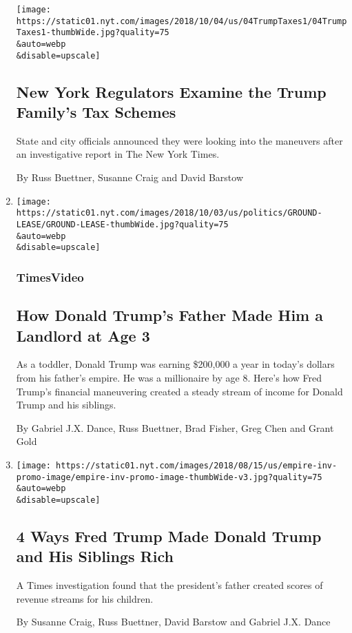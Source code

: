\begin{enumerate}
  \texttt{[image: https://static01.nyt.com/images/2018/10/04/us/04TrumpTaxes1/04TrumpTaxes1-thumbWide.jpg?quality=75\\\&auto=webp\\\&disable=upscale]}

  \hypertarget{new-york-regulators-examine-the-trump-familys-tax-schemes}{%
  \subsection{New York Regulators Examine the Trump Family's Tax
  Schemes}\label{new-york-regulators-examine-the-trump-familys-tax-schemes}}

  State and city officials announced they were looking into the
  maneuvers after an investigative report in The New York Times.

  By Russ Buettner, Susanne Craig and David Barstow
\item
  \href{/video/us/politics/100000006142467/-donald-fred-trump-taxes-ground-lease.html}{}

  \texttt{[image: https://static01.nyt.com/images/2018/10/03/us/politics/GROUND-LEASE/GROUND-LEASE-thumbWide.jpg?quality=75\\\&auto=webp\\\&disable=upscale]}

  \hypertarget{timesvideo}{%
  \subsubsection{TimesVideo}\label{timesvideo}}

  \hypertarget{how-donald-trumps-father-made-him-a-landlord-at-age-3}{%
  \subsection{How Donald Trump's Father Made Him a Landlord at Age
  3}\label{how-donald-trumps-father-made-him-a-landlord-at-age-3}}

  As a toddler, Donald Trump was earning \$200,000 a year in today's
  dollars from his father's empire. He was a millionaire by age 8.
  Here's how Fred Trump's financial maneuvering created a steady stream
  of income for Donald Trump and his siblings.

  By Gabriel J.X. Dance, Russ Buettner, Brad Fisher, Greg Chen and Grant
  Gold
\item
  \href{/interactive/2018/10/02/us/politics/trump-family-wealth.html}{}

  \texttt{[image: https://static01.nyt.com/images/2018/08/15/us/empire-inv-promo-image/empire-inv-promo-image-thumbWide-v3.jpg?quality=75\\\&auto=webp\\\&disable=upscale]}

  \hypertarget{4-ways-fred-trump-made-donald-trump-and-his-siblings-rich}{%
  \subsection{4 Ways Fred Trump Made Donald Trump and His Siblings
  Rich}\label{4-ways-fred-trump-made-donald-trump-and-his-siblings-rich}}

  A Times investigation found that the president's father created scores
  of revenue streams for his children.

  By Susanne Craig, Russ Buettner, David Barstow and Gabriel J.X. Dance
\end{enumerate}

